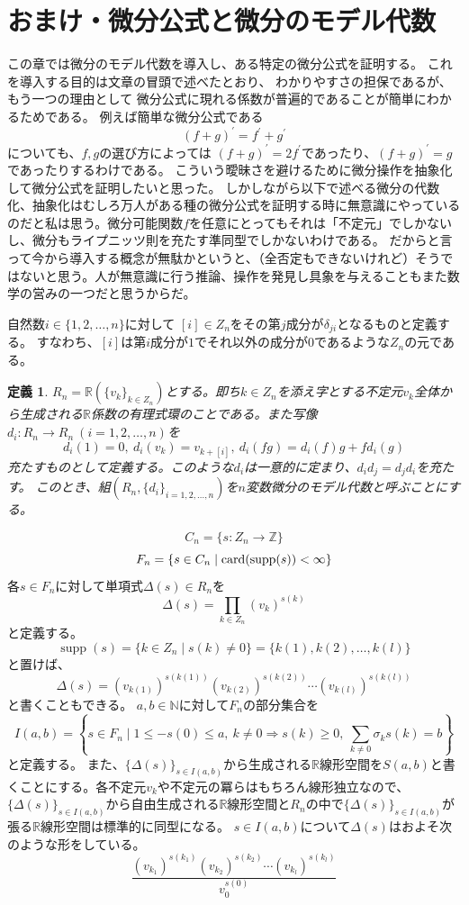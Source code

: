 \documentclass[leqno]{jsarticle}
\newtheorem{df}[thm]{定義}
\newcommand{\To}{\Longrightarrow}
\newcommand{\nn}{\mathbb{N}}
\newcommand{\zz}{\mathbb{Z}}
\newcommand{\rr}{\mathbb{R}}
\newcommand{\card}{\text{{\rm card}}}
\DeclareMathOperator{\supp}{supp}
\begin{document}
\section{おまけ・微分公式と微分のモデル代数}
この章では微分のモデル代数を導入し、ある特定の微分公式を証明する。
これを導入する目的は文章の冒頭で述べたとおり、
わかりやすさの担保であるが、もう一つの理由として
微分公式に現れる係数が普遍的であることが簡単にわかるためである。
例えば簡単な微分公式である
\[
(f+g)^{'}=f^{'}+g^{'}
\]
についても、$f,g$の選び方によっては
$(f+g)^{'}=2f^{'}$であったり、$(f+g)^{'}=g$であったりするわけである。
こういう曖昧さを避けるために微分操作を抽象化して微分公式を証明したいと思った。
しかしながら以下で述べる微分の代数化、抽象化はむしろ万人がある種の微分公式を証明する時に無意識にやっているのだと私は思う。微分可能関数$f$を任意にとってもそれは「不定元」でしかないし、微分もライプニッツ則を充たす準同型でしかないわけである。
だからと言って今から導入する概念が無駄かというと、（全否定もできないけれど）そうではないと思う。人が無意識に行う推論、操作を発見し具象を与えることもまた数学の営みの一つだと思うからだ。


自然数$i\in \{1,2,\dots, n\}$に対して
$[i]\in Z_n$をその第$j$成分が$\delta_{ji}$となるものと定義する。
すなわち、$[i]$は第$i$成分が$1$でそれ以外の成分が$0$であるような$Z_n$の元である。

\begin{df}

$R_n=\rr(\{v_k\}_{k\in Z_n})$とする。即ち$k\in Z_n$を添え字とする不定元$v_k$全体から生成される$\rr$係数の有理式環のことである。また写像$d_i:R_n\to R_n\ (i=1,2,\dots, n)$を
\[
d_i(1)=0,\ d_i(v_k)=v_{k+[i]},\ d_i(fg)=d_i(f)g+fd_i(g)
\]
充たすものとして定義する。このような$d_i$は一意的に定まり、$d_id_j=d_jd_i$を充たす。
このとき、組$(R_n, \{d_i\}_{i=1,2,\dots, n})$を$n$変数微分のモデル代数と呼ぶことにする。
\end{df}
\[
C_n=\{s:Z_n\to \zz\}
\]
\[
F_n=\{s\in C_n\mid \card(\supp(s))<\infty\}
\]
各$s\in F_n$に対して単項式$\Delta(s)\in R_n$を
\[
\Delta(s)=\prod_{k\in Z_n}(v_k)^{s(k)}
\]
と定義する。
\[
\supp(s)=\{k\in Z_n\mid s(k)\neq 0 \}=\{k(1), k(2), \dots, k(l)\}
\]
と置けば、
\[
\Delta(s)=(v_{k(1)})^{s(k(1))}(v_{k(2)})^{s(k(2))}\cdots (v_{k(l)})^{s(k(l))}
\]
と書くこともできる。
$a, b\in \nn$に対して$F_n$の部分集合を
\[
I(a, b)=\left\{s\in F_n\mid 1\le -s(0)\le a, \  k\neq0\To s(k)\ge0,\ \sum_{k\neq 0}\sigma_ks(k)=b\right\}
\]
と定義する。
また、$\{\Delta(s)\}_{s\in I(a,b)}$から生成される$\rr$線形空間を$S(a,b)$と書くことにする。各不定元$v_k$や不定元の冪らはもちろん線形独立なので、$\{\Delta(s)\}_{s\in I(a,b)}$から自由生成される$\rr$線形空間と$R_n$の中で$\{\Delta(s)\}_{s\in I(a,b)}$が張る$\rr$線形空間は標準的に同型になる。
$s\in I(a,b)$について$\Delta(s)$はおよそ次のような形をしている。
\[
\frac{(v_{k_1})^{s(k_1)}(v_{k_2})^{s(k_2)}\cdots (v_{k_l})^{s(k_l)}}{v_0^{s(0)}}
\]
\end{document}
